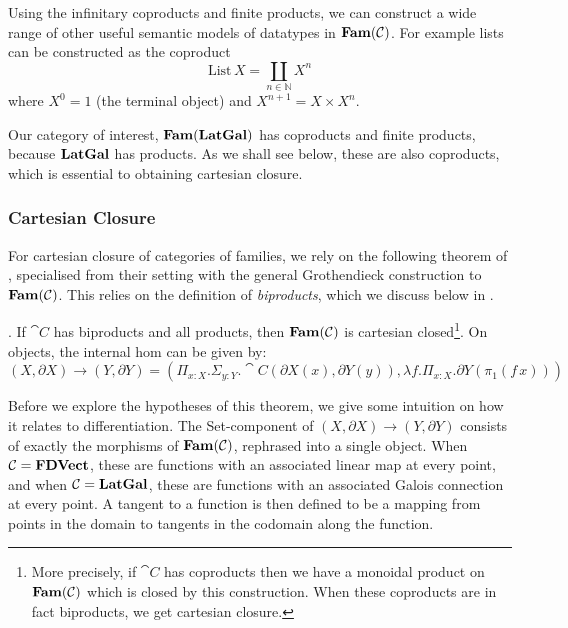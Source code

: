 Using the infinitary coproducts and finite products, we can construct
a wide range of other useful semantic models of datatypes in
$\mathbf{Fam}(\mathcal{C})$. For example lists can be constructed as the coproduct
\begin{displaymath}
  \mathrm{List}\,X = \coprod_{n \in \mathbb{N}} X^n
\end{displaymath}
where $X^0 = 1$ (the terminal object) and $X^{n+1} = X \times X^n$.

Our category of interest, $\mathbf{Fam}(\mathbf{LatGal})$ has coproducts and finite
products, because $\mathbf{LatGal}$ has products. As we shall see below, these
are also coproducts, which is essential to obtaining cartesian
closure.

\subsubsection{Cartesian Closure}

For cartesian closure of categories of families, we rely on the
following theorem of \citet{nunes2023}, specialised from their setting
with the general Grothendieck construction to $\mathbf{Fam}(\mathcal{C})$. This
relies on the definition of \emph{biproducts}, which we discuss below
in .

\begin{theorem}
  \label{thm:fam-closed}
  \AGDA.  If $\cat{C}$ has biproducts and all products, then
  $\mathbf{Fam}(\mathcal{C})$ is cartesian closed\footnote{More precisely, if
    $\cat{C}$ has coproducts then we have a monoidal product on
    $\mathbf{Fam}(\mathcal{C})$ which is closed by this construction. When these
    coproducts are in fact biproducts, we get cartesian closure.}. On
  objects, the internal hom can be given by:
  \begin{displaymath}
    (X, \partial X) \to (Y, \partial Y) = (\Pi_{x : X}. \Sigma_{y : Y}. \cat{C}(\partial X(x), \partial Y(y)), \lambda f. \Pi_{x : X}. \partial Y(\pi_1(f\, x)))
  \end{displaymath}
\end{theorem}

Before we explore the hypotheses of this theorem, we give some
intuition on how it relates to differentiation. The Set-component of
$(X, \partial X) \to (Y, \partial Y)$ consists of exactly the
morphisms of $\mathbf{Fam}(\mathcal{C})$, rephrased into a single object. When
$\mathcal{C} = \mathbf{FDVect}$, these are functions with an associated linear
map at every point, and when $\mathcal{C} = \mathbf{LatGal}$, these are functions
with an associated Galois connection at every point. A tangent to a
function is then defined to be a mapping from points in the domain to
tangents in the codomain along the function.

